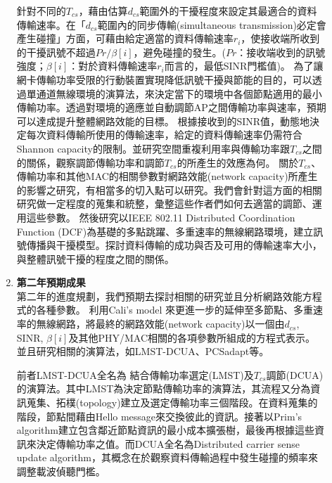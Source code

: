 \documentclass[12pt,a4paper]{article}
\begin{document}
\begin{description}
\begin{enumerate}
針對不同的$T_{cs}$，藉由估算$d_{cs}$範圍外的干擾程度來設定其最適合的資料傳輸速率。在「$d_{cs}$範圍內的同步傳輸(simultaneous transmission)必定會產生碰撞」方面，可藉由給定適當的資料傳輸速率$r_i$，使接收端所收到的干擾訊號不超過$Pr/\beta[i]$，避免碰撞的發生。($Pr$：接收端收到的訊號強度；$\beta[i]$：對於資料傳輸速率$r_i$而言的，最低SINR門檻值)。
為了讓網卡傳輸功率受限的行動裝置實現降低訊號干擾與節能的目的，可以透過單通道無線環境的演算法，來決定當下的環境中各個節點適用的最小傳輸功率。透過對環境的適應並自動調節AP之間傳輸功率與速率，預期可以達成提升整體網路效能的目標。
根據接收到的SINR值，動態地決定每次資料傳輸所使用的傳輸速率，給定的資料傳輸速率仍需符合Shannon capacity的限制。並研究空間重複利用率與傳輸功率跟$T_{cs}$之間的關係，觀察調節傳輸功率和調節$T_{cs}$的所產生的效應為何。
關於$T_{cs}$、傳輸功率和其他MAC的相關參數對網路效能(network capacity)所產生的影響之研究，有相當多的切入點可以研究。我們會針對這方面的相關研究做一定程度的蒐集和統整，彙整這些作者們如何去適當的調節、運用這些參數。
然後研究以IEEE 802.11 Distributed Coordination Function (DCF)為基礎的多點跳躍、多重速率的無線網路環境，建立訊號傳播與干擾模型。探討資料傳輸的成功與否及可用的傳輸速率大小，與整體訊號干擾的程度之間的關係。\\

\item [\textbullet]	{\textbf{\Kai 第二年預期成果}}\\

第二年的進度規劃，我們預期去探討相關的研究並且分析網路效能方程式的各種參數。
利用Cali’s model 來更進一步的延伸至多節點、多重速率的無線網路，將最終的網路效能(network capacity)以一個由$d_{cs}$, SINR, $\beta[i]$及其他PHY/MAC相關的各項參數所組成的方程式表示。
並且研究相關的演算法，如LMST-DCUA、PCSadapt等。

前者LMST-DCUA全名為
結合傳輸功率選定(LMST)及$T_{cs}$調節(DCUA)的演算法。其中LMST為決定節點傳輸功率的演算法，其流程又分為資訊蒐集、拓樸(topology)建立及選定傳輸功率三個階段。在資料蒐集的階段，節點間藉由Hello message來交換彼此的資訊。接著以Prim’s algorithm建立包含鄰近節點資訊的最小成本擴張樹，最後再根據這些資訊來決定傳輸功率之值。而DCUA全名為Distributed carrier sense update algorithm，其概念在於觀察資料傳輸過程中發生碰撞的頻率來調整載波偵聽門檻。


\end{enumerate}
\end{description}
\end{document}
